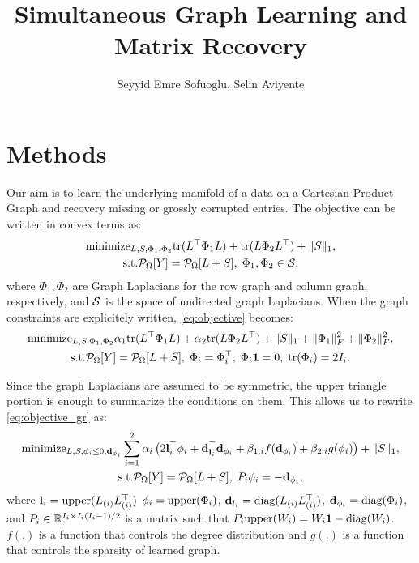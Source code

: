 \documentclass{article}
\title{Simultaneous Graph Learning and Matrix Recovery}
\author{Seyyid Emre Sofuoglu, Selin Aviyente}
\begin{document}
\maketitle

\section{Methods}
Our aim is to learn the underlying manifold of a data on a Cartesian Product Graph and recovery missing or grossly corrupted entries. The objective can be written in convex terms as:
\begin{gather}
    \text{minimize}_{L, S, \Phi_1, \Phi_2}\mathrm{tr}(L^\top \Phi_1 L) + \mathrm{tr}(L \Phi_2 L^\top) + \|S\|_1, \nonumber \\ \text{s.t.} \P_{\Omega}[Y] = \P_{\Omega}[L + S], \; \Phi_1, \Phi_2 \in \S, 
    \label{eq:objective}
\end{gather}
where $\Phi_1, \Phi_2$ are Graph Laplacians for the row graph and column graph, respectively, and $\S$ is the space of undirected graph Laplacians. When the graph constraints are explicitely written, \eqref{eq:objective} becomes:
\begin{gather}
    \text{minimize}_{L, S, \Phi_1, \Phi_2}\alpha_1\mathrm{tr}(L^\top \Phi_1 L) + \alpha_2\mathrm{tr}(L \Phi_2 L^\top) + \|S\|_1 + \|\Phi_1\|_F^2+ \|\Phi_2\|_F^2, \nonumber\\ \text{s.t.} \P_{\Omega}[Y] = \P_{\Omega}[L + S], \; \Phi_i=\Phi_i^\top, \; \Phi_i\mathbf{1} = 0, \; \mathrm{tr}(\Phi_i)=2I_i.
    \label{eq:objective_gr}
\end{gather}

Since the graph Laplacians are assumed to be symmetric, the upper triangle portion is enough to summarize the conditions on them. This allows us to rewrite \eqref{eq:objective_gr} as:
\begin{gather}
    \text{minimize}_{L, S, \phi_i\leq 0, \d_{\phi_i}} \sum_{i=1}^2\alpha_i\left(2\l_i^\top \phi_i + \d_{\l_i}^\top \d_{\phi_i}+\beta_{1,i}f(\d_{\phi_i})+\beta_{2,i} g(\phi_i) \right) + \|S\|_1, \nonumber\\ \text{s.t.} \P_{\Omega}[Y] = \P_{\Omega}[L + S], \; P_i \phi_i = -\d_{\phi_i},
\end{gather}
where $\l_i=\upper(L_{(i)} L_{(i)}^\top)$ $\phi_i=\upper(\Phi_i)$, $\d_{l_i}=\diag(L_{(i)} L_{(i)}^\top)$, $\d_{\phi_i} = \diag(\Phi_i)$, and $P_i\in\R^{I_i\times I_i(I_i-1)/2}$ is a matrix such that $P_i \upper(W_i) = W_i\mathbf{1}-\diag(W_i)$. $f(.)$ is a function that controls the degree distribution and $g(.)$ is a function that controls the sparsity of learned graph.
\end{document}
